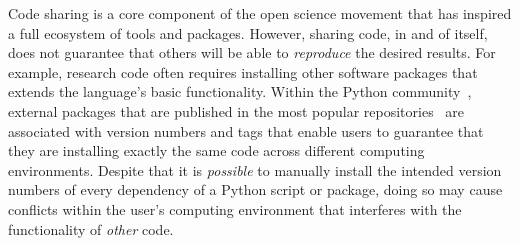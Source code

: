 \documentclass[preprint,12pt, a4paper]{elsarticle}
\begin{document}
Code sharing is a core component of the open science movement
that has inspired a full ecosystem of tools and packages.  However,
sharing code, in and of itself, does not guarantee that others will be
able to \textit{reproduce} the desired results.  For example, research
code often requires installing other software packages that extends
the language's basic functionality.  Within the Python community~\citep{vanR95},
external packages that are published in the most popular 
repositories~\citep{pypi, Anac12} are associated with version numbers
and tags that enable users to guarantee that they are installing
exactly the same code across different computing environments.
Despite that it is \textit{possible} to manually install the intended version numbers of
every dependency of a Python script or package, doing so may cause
conflicts within the user's computing environment that interferes with
the functionality of  \textit{other} code.
\end{document}
